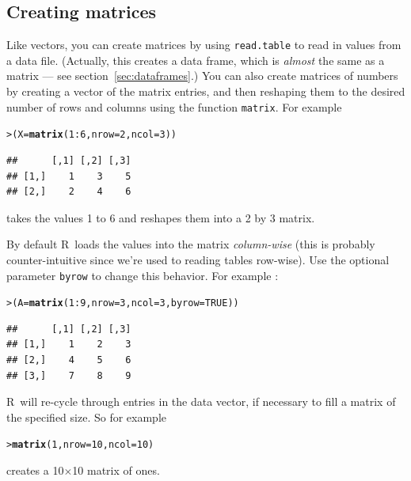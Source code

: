 \documentclass[11pt]{article}\usepackage[]{graphicx}\usepackage[]{color}
\makeatletter
\newcommand{\hlnum}[1]{\textcolor[rgb]{0.686,0.059,0.569}{#1}}%
\newcommand{\hlopt}[1]{\textcolor[rgb]{0,0,0}{#1}}%
\newcommand{\hlstd}[1]{\textcolor[rgb]{0.345,0.345,0.345}{#1}}%
\newcommand{\hlkwb}[1]{\textcolor[rgb]{0.69,0.353,0.396}{#1}}%
\newcommand{\hlkwc}[1]{\textcolor[rgb]{0.333,0.667,0.333}{#1}}%
\newcommand{\hlkwd}[1]{\textcolor[rgb]{0.737,0.353,0.396}{\textbf{#1}}}%
\newenvironment{kframe}{%
 \def\at@end@of@kframe{}%
 \ifinner\ifhmode%
  \def\at@end@of@kframe{\end{minipage}}%
  \begin{minipage}{\columnwidth}%
 \fi\fi%
 \def\FrameCommand##1{\hskip\@totalleftmargin \hskip-\fboxsep
 \colorbox{shadecolor}{##1}\hskip-\fboxsep
     \hskip-\linewidth \hskip-\@totalleftmargin \hskip\columnwidth}%
 \MakeFramed {\advance\hsize-\width
   \@totalleftmargin\z@ \linewidth\hsize
   \@setminipage}}%
 {\par\unskip\endMakeFramed%
 \at@end@of@kframe}
\newenvironment{knitrout}{}{} %
\newcommand{\code}[1]{{\tt #1}}
\newcommand\R{{\sf R}}
\numberwithin{exercise}{section}
\makeatother
\begin{document}
\subsection{Creating matrices}
Like vectors, you can create matrices by 
using \code{read.table} to read in 
values from a data file.  (Actually, this
creates a data frame, which is \emph{almost}
the same as a matrix --- see section~\ref{sec:dataframes}.)
You can also create matrices of numbers by creating a vector of the matrix 
entries, and then reshaping them to the desired number of rows
and columns using the function \code{matrix}. For example 
\begin{knitrout}
\color{fgcolor}\begin{kframe}
\begin{alltt}
\hlstd{> }\hlstd{(X} \hlkwb{=} \hlkwd{matrix}\hlstd{(}\hlnum{1}\hlopt{:}\hlnum{6}\hlstd{,} \hlkwc{nrow} \hlstd{=} \hlnum{2}\hlstd{,} \hlkwc{ncol} \hlstd{=} \hlnum{3}\hlstd{))}
\end{alltt}
\begin{verbatim}
##      [,1] [,2] [,3]
## [1,]    1    3    5
## [2,]    2    4    6
\end{verbatim}
\end{kframe}
\end{knitrout}
\noindent takes the values 1 to 6 and reshapes them into a 2 by 3 matrix.

By default \R\ loads the values into
the matrix \emph{column-wise} (this is
probably counter-intuitive since we're used
to reading tables row-wise). 
Use the optional
parameter \code{byrow} to change this behavior. 
For example :
\begin{knitrout}
\color{fgcolor}\begin{kframe}
\begin{alltt}
\hlstd{> }\hlstd{(A}\hlkwb{=}\hlkwd{matrix}\hlstd{(}\hlnum{1}\hlopt{:}\hlnum{9}\hlstd{,} \hlkwc{nrow} \hlstd{=} \hlnum{3}\hlstd{,} \hlkwc{ncol} \hlstd{=} \hlnum{3}\hlstd{,} \hlkwc{byrow} \hlstd{=} \hlnum{TRUE}\hlstd{))}
\end{alltt}
\begin{verbatim}
##      [,1] [,2] [,3]
## [1,]    1    2    3
## [2,]    4    5    6
## [3,]    7    8    9
\end{verbatim}
\end{kframe}
\end{knitrout}

\R\ will re-cycle through entries in the data vector, if necessary
to fill a matrix of the specified size. So for example
\begin{knitrout}
\color{fgcolor}\begin{kframe}
\begin{alltt}
\hlstd{> }\hlkwd{matrix}\hlstd{(}\hlnum{1}\hlstd{,} \hlkwc{nrow} \hlstd{=} \hlnum{10}\hlstd{,} \hlkwc{ncol} \hlstd{=} \hlnum{10}\hlstd{)}
\end{alltt}
\end{kframe}
\end{knitrout}
\noindent creates a 10$\times$10 matrix of ones.
\end{document}
